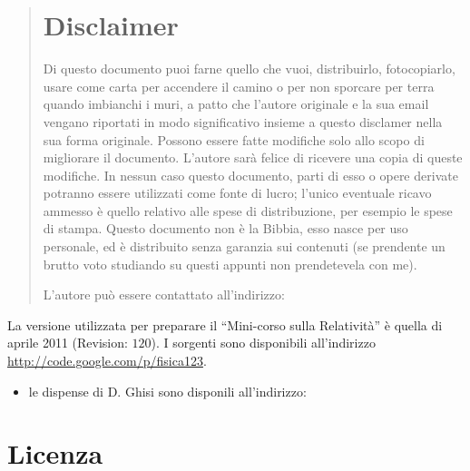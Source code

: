 \begin{quote}
\section*{\centering Disclaimer}
Di questo documento puoi farne quello che vuoi, distribuirlo, fotocopiarlo, usare come carta per accendere il camino 
o per non sporcare per terra quando imbianchi i muri, a patto che l'autore originale 
e la sua email vengano riportati in modo significativo insieme a questo disclamer nella sua forma originale. 
Possono essere fatte modifiche solo allo scopo di migliorare il do\-cu\-men\-to. 
L'autore sarà felice di ricevere una copia di queste modifiche. 
In nessun caso questo documento, parti di esso o opere derivate potranno essere utilizzati come  fonte di lucro; 
l'unico eventuale ricavo ammesso è quello relativo alle spese di distribuzione, per esempio le spese di stampa. 
Questo documento non è la Bibbia, esso nasce per uso personale, ed è distribuito senza garanzia sui contenuti 
(se prendente un brutto voto studiando su questi appunti non prendetevela con me).

L'autore può essere contattato all'indirizzo:
\begin{center}
\end{center}
\end{quote}
\rmfamily\upshape

La versione utilizzata per preparare il ``Mini-corso sulla Relatività'' è quella di aprile 2011 (Revision: $120$). 
I sorgenti sono disponibili all'indirizzo \href{http://code.google.com/p/fisica123}{http://code.google.com/p/fisica123}.

\begin{itemize}
 \item le dispense di D. Ghisi sono disponili all'indirizzo: 
\end{itemize}

\begin{center}
\end{center}
\rmfamily\upshape

\section[Licenza]{Licenza}

